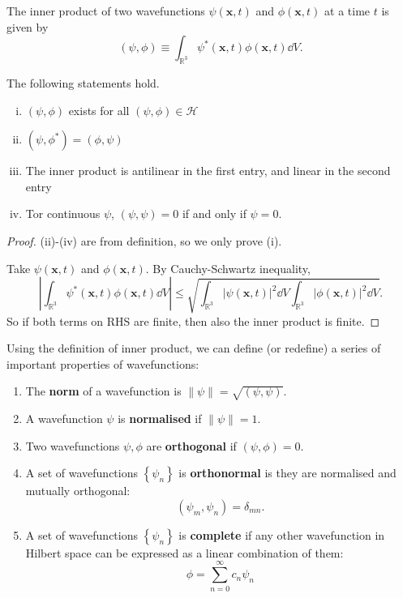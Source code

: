 \documentclass[a4paper]{article}
\begin{document}
\begin{definition}
    The inner product of two wavefunctions $\psi(\mathbf{x}, t)$ and $\phi(\mathbf{x}, t)$ at a time $t$ is given by
    \[
    (\psi, \phi) \equiv \int_{\mathbb{R}^3} \psi^*(\mathbf{x}, t) \phi(\mathbf{x}, t) \dd V .
    \]
\end{definition}

\begin{theorem}
    The following statements hold.
\begin{enumerate}[(i)]
	\item \( (\psi, \phi) \) exists for all \( (\psi, \phi) \in \mathcal H \)
	\item \( (\psi, \phi^*) = (\phi, \psi) \)
	\item The inner product is antilinear in the first entry, and linear in the second entry
	\item Tor continuous \( \psi \), \( (\psi, \psi) = 0 \) if and only if \( \psi=0 \).
\end{enumerate}
\end{theorem}
\begin{proof}
    (ii)-(iv) are from definition, so we only prove (i). 

    Take $\psi(\mathbf{x}, t)$ and $\phi(\mathbf{x}, t)$. By Cauchy-Schwartz inequality,
    \[
    \left|\int_{\mathbb{R}^3} \psi^*(\mathbf{x}, t) \phi(\mathbf{x}, t) \dd V\right| \leq \sqrt{\int_{\mathbb{R}^3}|\psi(\mathbf{x}, t)|^2 \dd V \int_{\mathbb{R}^3}|\phi(\mathbf{x}, t)|^2 \dd V} .
    \]
    So if both terms on RHS are finite, then also the inner product is finite.
\end{proof}

Using the definition of inner product, we can define (or redefine) a series of important properties of wavefunctions:

\begin{definition}
    \begin{enumerate}
        \item The \textbf{norm} of a wavefunction is $\|\psi\|=\sqrt{(\psi, \psi)}$.
        \item A wavefunction $\psi$ is \textbf{normalised} if $\|\psi\|=1$.
        \item Two wavefunctions $\psi, \phi$ are \textbf{orthogonal} if $(\psi, \phi)=0$.
        \item A set of wavefunctions $\left\{\psi_n\right\}$ is \textbf{orthonormal} is they are normalised and mutually orthogonal:
        \[
        \left(\psi_m, \psi_n\right)=\delta_{m n} .
        \]
        \item A set of wavefunctions $\left\{\psi_n\right\}$ is \textbf{complete} if any other wavefunction in Hilbert space can be expressed as a linear combination of them:
        \[
        \phi=\sum_{n=0}^{\infty} c_n \psi_n
        \]
    \end{enumerate}
\end{definition}
\end{document}
